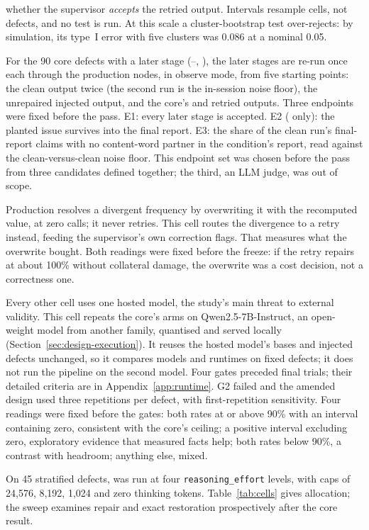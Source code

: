 \begin{description}[leftmargin=1.2em,style=nextline]
  whether the supervisor \emph{accepts} the retried output. Intervals resample
  cells, not defects, and no test is run. At this scale a cluster-bootstrap
  test over-rejects: by simulation, its type~I error with five clusters was
  0.086 at a nominal 0.05.
\item[Downstream propagation.] For the 90 core defects with a later stage
  (--, ), the later stages are re-run once each through
  the production nodes, in observe mode, from five starting points: the clean
  output twice (the second run is the in-session noise floor), the unrepaired
  injected output, and the core's  and  retried outputs. Three
  endpoints were fixed before the pass. E1: every later stage is accepted. E2
  ( only): the planted issue survives into the final report. E3: the
  share of the clean run's final-report claims with no content-word partner in
  the condition's report, read against the clean-versus-clean noise floor. This
  endpoint set was chosen before the pass from three candidates defined
  together; the third, an LLM judge, was out of scope.
\item[Overwrite counterfactual.] Production resolves a divergent frequency by
  overwriting it with the recomputed value, at zero calls; it never retries.
  This cell routes the divergence to a retry instead, feeding  the
  supervisor's own correction flags. That measures what the overwrite bought.
  Both readings were fixed before the freeze: if the retry repairs at about
  100\% without collateral damage, the overwrite was a cost decision, not a
  correctness one.
\item[Second model.] Every other cell uses one hosted model, the study's main
  threat to external validity. This cell repeats the core's arms on
  Qwen2.5-7B-Instruct, an open-weight model from another family, quantised and
  served locally (Section~\ref{sec:design-execution}). It reuses the hosted
  model's bases and injected defects unchanged, so it compares models and
  runtimes on fixed defects; it does not run the pipeline on the second model.
  Four gates preceded final trials; their detailed criteria are in
  Appendix~\ref{app:runtime}. G2 failed and the amended design used three
  repetitions per defect, with first-repetition sensitivity.
  Four readings were fixed before the gates: both rates at or
  above 90\% with an interval containing zero, consistent with the core's
  ceiling; a positive interval excluding zero, exploratory evidence that
  measured facts help; both rates below 90\%, a contrast with headroom; anything
  else, mixed.
\item[Thinking-budget sweep.] On 45 stratified defects, \model{} was run at
  four \texttt{reasoning\_effort} levels, with caps of 24,576, 8,192, 1,024
  and zero thinking tokens. Table~\ref{tab:cells} gives allocation; the sweep
  examines repair and exact restoration prospectively after the core result.
\end{description}

